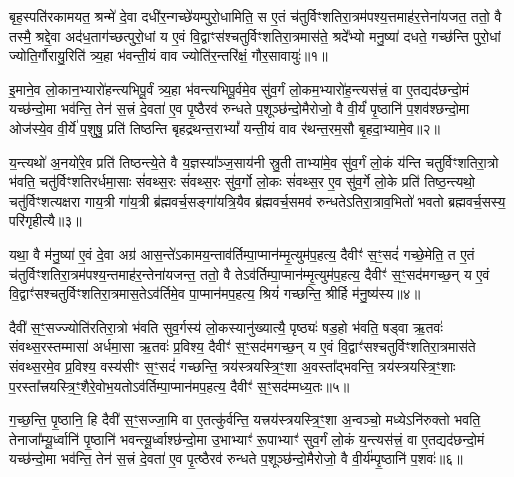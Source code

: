 \setcounter{anuvakam}{0}
बृह॒स्पति॑रकामयत॒ श्रन्मे॑ दे॒वा दधी॑र॒न्गच्छे॑यम्पुरो॒धामिति॒ स ए॒तं च॑तुर्विꣳशतिरा॒त्रम॑पश्य॒त्तमाह॑र॒त्तेना॑यजत॒ ततो॒ वै तस्मै॒ श्रद्दे॒वा अद॑ध॒ताग॑च्छत्पुरो॒धां य ए॒वं वि॒द्वाꣳस॑श्चतुर्विꣳशतिरा॒त्रमास॑ते॒ श्रदे᳚भ्यो मनु॒ष्या॑ दधते॒ गच्छ॑न्ति पुरो॒धां ज्योति॒र्गौरायु॒रिति॑ त्र्य॒हा भ॑वन्ती॒यं वाव ज्योति॑र॒न्तरि॑क्षं॒ गौर॒सावायुः॑॥१॥

इ॒माने॒व लो॒कान॒भ्यारो॑हन्त्यभिपू॒र्वं त्र्य॒हा भ॑वन्त्यभिपू॒र्वमे॒व सु॑व॒र्गं लो॒कम॒भ्यारो॑ह॒न्त्यस॑त्त्रं॒ वा ए॒तद्यद॑छन्दो॒मं यच्छ॑न्दो॒मा भव॑न्ति॒ तेन॑ स॒त्त्रं दे॒वता॑ ए॒व पृ॒ष्ठैरव॑ रुन्धते प॒शूञ्छ॑न्दो॒मैरोजो॒ वै वी॒र्यं॑ पृ॒ष्ठानि॑ प॒शव॑श्छन्दो॒मा ओज॑स्ये॒व वी॒र्ये॑ प॒शुषु॒ प्रति॑ तिष्ठन्ति बृहद्रथन्त॒रा\-भ्यां᳚ यन्ती॒यं वाव र॑थन्त॒रम॒सौ बृ॒हदा॒भ्यामे॒व॥२॥

य॒न्त्यथो॑ अ॒नयो॑रे॒व प्रति॑ तिष्ठन्त्ये॒ते वै य॒ज्ञस्या᳚ञ्ज॒साय॑नी स्रु॒ती ताभ्या॑मे॒व सु॑व॒र्गं लो॒कं य॑न्ति चतुर्विꣳशतिरा॒त्रो भ॑वति॒ चतु॑र्विꣳशतिरर्धमा॒साः सं॑वथ्स॒रः सं॑वथ्स॒रः सु॑व॒र्गो लो॒कः सं॑वथ्स॒र ए॒व सु॑व॒र्गे लो॒के प्रति॑ तिष्ठ॒न्त्यथो॒ चतु॑र्विꣳशत्यक्षरा गाय॒त्री गा॑य॒त्री ब्र॑ह्मवर्च॒सङ्गा॑यत्रि॒यैव ब्र॑ह्मवर्च॒समव॑ रुन्धते\-ऽतिरा॒त्राव॒भितो॑ भवतो ब्रह्मवर्च॒सस्य॒ परि॑गृहीत्यै॥३॥

{\anuvakamend[{अ॒सावायु॑रा॒भ्यामे॒व पञ्च॑चत्वारिꣳशच्च॥१॥}]}

यथा॒ वै म॑नु॒ष्या॑ ए॒वं दे॒वा अग्र॑ आस॒न्ते॑\-ऽकामय॒न्ताव॑र्तिम्पा॒प्मान॑म्मृ॒त्युम॑प॒हत्य॒ दैवीꣳ॑ स॒ꣳ॒सदं॑ गच्छे॒मेति॒ त ए॒तं च॑तुर्विꣳशतिरा॒त्रम॑पश्य॒न्तमाह॑र॒न्तेना॑यजन्त॒ ततो॒ वै ते\-ऽव॑र्तिम्पा॒प्मान॑म्मृ॒त्युम॑प॒हत्य॒ दैवीꣳ॑ स॒ꣳ॒सद॑मगच्छ॒न् य ए॒वं वि॒द्वाꣳ॑सश्चतुर्विꣳशतिरा॒त्रमास॒ते\-ऽव॑र्तिमे॒व पा॒प्मान॑मप॒हत्य॒ श्रियं॑ गच्छन्ति॒ श्रीर्\mbox{}हि म॑नु॒ष्य॑स्य॥४॥

दैवी॑ स॒ꣳ॒सज्ज्योति॑रतिरा॒त्रो भ॑वति सुव॒र्गस्य॑ लो॒कस्यानु॑ख्यात्यै॒ पृष्ठ्यः॑ षड॒हो भ॑वति॒ षड्वा ऋ॒तवः॑ संवथ्स॒रस्तम्मासा॑ अर्धमा॒सा ऋ॒तवः॑ प्र॒विश्य॒ दैवीꣳ॑ स॒ꣳ॒सद॑मगच्छ॒न् य ए॒वं वि॒द्वाꣳ॑सश्चतुर्विꣳशतिरा॒त्रमास॑ते संवथ्स॒रमे॒व प्र॒विश्य॒ वस्य॑सीꣳ स॒ꣳ॒सदं॑ गच्छन्ति॒ त्रय॑स्त्रयस्त्रि॒ꣳ॒शा अ॒वस्ता᳚द्भवन्ति॒ त्रय॑स्त्रयस्त्रि॒ꣳ॒शाः प॒रस्ता᳚त्त्रयस्त्रि॒ꣳ॒शैरे॒वोभ॒यतो\-ऽव॑र्तिम्पा॒प्मान॑मप॒हत्य॒ दैवीꣳ॑ स॒ꣳ॒सद॑म्मध्य॒तः॥५॥

ग॒च्छ॒न्ति॒ पृ॒ष्ठानि॒ हि दैवी॑ स॒ꣳ॒सज्जा॒मि वा ए॒तत्कु॑र्वन्ति॒ यत्त्रय॑स्त्रयस्त्रि॒ꣳ॒शा अ॒न्वञ्चो॒ मध्ये\-ऽनि॑रुक्तो भवति॒ तेनाजा᳚म्यू॒र्ध्वानि॑ पृ॒ष्ठानि॑ भवन्त्यू॒र्ध्वाश्छ॑न्दो॒मा उ॒भाभ्याꣳ॑ रू॒पाभ्याꣳ॑ सुव॒र्गं लो॒कं य॒न्त्यस॑त्त्रं॒ वा ए॒तद्यद॑छन्दो॒मं यच्छ॑न्दो॒मा भव॑न्ति॒ तेन॑ स॒त्त्रं दे॒वता॑ ए॒व पृ॒त्ष्ठैरव॑ रुन्धते प॒शूञ्छ॑न्दो॒मैरोजो॒ वै वी॒र्य॑म्पृ॒ष्ठानि॑ प॒शवः॑॥६॥

